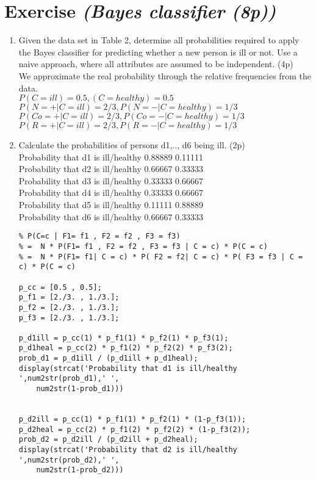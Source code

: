 \documentclass{article}
\begin{document}
\section{Exercise \textit{(Bayes classifier (8p))}}
\begin{enumerate}
    \item Given the data set in Table 2, determine all probabilities required to apply the Bayes classifier for predicting whether a new person is ill or not. Use a naive approach, where all attributes are assumed to be independent. (4p) \\
      We approximate the real probability through the relative frequencies from the data. \\
      $P(C=ill)=0.5, (C=healthy)=0.5$ \\
      $P(N=+|C=ill)=2/3 , P(N=-|C=healthy)=1/3$\\
      $P(Co=+|C=ill)=2/3 , P(Co=-|C=healthy)=1/3$\\
      $P(R=+|C=ill)=2/3 , P(R=-|C=healthy)=1/3$
   \item Calculate the probabilities of persons d1,.., d6 being ill. (2p) \\
   Probability that d1 is ill/healthy 0.88889 0.11111 \\
   Probability that d2 is ill/healthy 0.66667 0.33333 \\
   Probability that d3 is ill/healthy 0.33333 0.66667 \\
   Probability that d4 is ill/healthy 0.33333 0.66667 \\
   Probability that d5 is ill/healthy 0.11111 0.88889 \\
   Probability that d6 is ill/healthy 0.66667 0.33333 \\
   \newpage
   \begin{verbatim}
% P(C=c | F1= f1 , F2 = f2 , F3 = f3)
% =  N * P(F1= f1 , F2 = f2 , F3 = f3 | C = c) * P(C = c)
% =  N * P(F1= f1| C = c) * P( F2 = f2| C = c) * P( F3 = f3 | C = c) * P(C = c)

p_cc = [0.5 , 0.5];
p_f1 = [2./3. , 1./3.];
p_f2 = [2./3. , 1./3.];
p_f3 = [2./3. , 1./3.];

p_d1ill = p_cc(1) * p_f1(1) * p_f2(1) * p_f3(1);
p_d1heal = p_cc(2) * p_f1(2) * p_f2(2) * p_f3(2);
prob_d1 = p_d1ill / (p_d1ill + p_d1heal);
display(strcat('Probability that d1 is ill/healthy ',num2str(prob_d1),' ',
    num2str(1-prob_d1)))


p_d2ill = p_cc(1) * p_f1(1) * p_f2(1) * (1-p_f3(1));
p_d2heal = p_cc(2) * p_f1(2) * p_f2(2) * (1-p_f3(2));
prob_d2 = p_d2ill / (p_d2ill + p_d2heal);
display(strcat('Probability that d2 is ill/healthy ',num2str(prob_d2),' ',
    num2str(1-prob_d2)))


\end{verbatim}
\end{enumerate}
\end{document}

